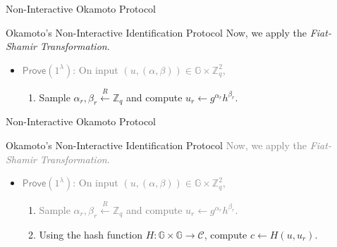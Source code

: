 \documentclass[xcolor={usenames,dvipsnames}]{beamer}
\begin{document}
    \begin{frame}{Non-Interactive Okamoto Protocol}
        \begin{block}{Okamoto's Non-Interactive Identification Protocol}
            Now, we apply the \textit{Fiat-Shamir Transformation}.
            \begin{itemize}
                \item \textcolor{gray}{$\mathsf{Prove}(1^{\lambda})$: On input $(u,(\alpha,\beta)) \in \mathbb{G} \times \mathbb{Z}_q^2$, }
                \begin{enumerate}
                    \item \textcolor{blue!80!black}{Sample $\alpha_r,\beta_r \xleftarrow{R} \mathbb{Z}_q$ and compute $u_r \gets g^{\alpha_r}h^{\beta_r}$.}
                \end{enumerate}
            \end{itemize}
        \end{block}
    \end{frame}

    \begin{frame}{Non-Interactive Okamoto Protocol}
        \begin{block}{Okamoto's Non-Interactive Identification Protocol}
            \textcolor{gray}{Now, we apply the \textit{Fiat-Shamir Transformation}.}
            \begin{itemize}
                \item \textcolor{gray}{$\mathsf{Prove}(1^{\lambda})$: On input $(u,(\alpha,\beta)) \in \mathbb{G} \times \mathbb{Z}_q^2$, }
                \begin{enumerate}
                    \item \textcolor{gray}{Sample $\alpha_r,\beta_r \xleftarrow{R} \mathbb{Z}_q$ and compute $u_r \gets g^{\alpha_r}h^{\beta_r}$.}
                    \item \textcolor{blue!80!black}{Using the hash function $H: \mathbb{G} \times \mathbb{G} \to \mathcal{C}$, compute $c \gets H(u,u_r)$.}
                \end{enumerate}
            \end{itemize}
        \end{block}
    \end{frame}
\end{document}
